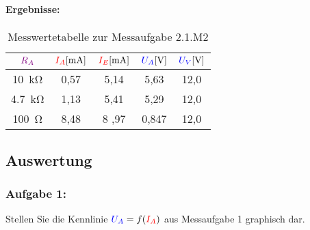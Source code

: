 \documentclass[11pt,a4paper,titlepage]{scrreprt}
\begin{document}
               \paragraph{Ergebnisse:}
                   \begin{center}
                       \begin{table}[!hbtp]
                           \caption{Messwertetabelle zur Messaufgabe 2.1.M2}
                           \label{tbl:messergebnisse2.2}
                           \renewcommand{\arraystretch}{1.3}
                           \begin{center}
                               \begin{tabular}{c|cccc}
                                   $\textcolor{violet}{R_A}$&
                                   $\textcolor{red}{I_A} [\si{\milli\ampere}]$  &
                                   $\textcolor{red}{I_E} [\si{\milli\ampere}]$ &
                                   $\textcolor{blue}{U_A} [\si{\volt}]$ &
                                   $\textcolor{blue}{U_V} [\si{\volt}]$ \\ \hline

                                   \SI{10}{\kilo\ohm} & 0,57 & 5,14 & 5,63 & 12,0\\
                                   \SI{4,7}{\kilo\ohm} & 1,13 & 5,41 & 5,29 & 12,0\\
                                   \SI{100}{\ohm} & 8,48 &8 ,97 & 0,847 & 12,0\\

                               \end{tabular}
                           \end{center}
                       \end{table}
                   \end{center}
         \subsection{Auswertung}
           \subsubsection{Aufgabe 1:} Stellen Sie die Kennlinie $\textcolor{blue}{U_A} = f(\textcolor{red}{I_A})$ aus Messaufgabe 1 graphisch dar.
\end{document}
